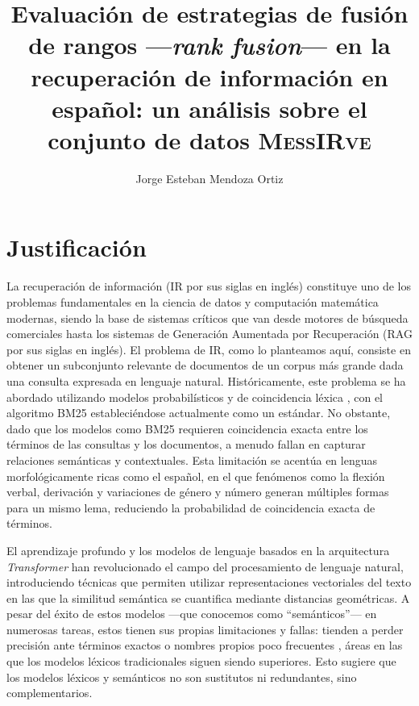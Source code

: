 \documentclass[12pt]{article}
\begin{document}
    
    
    \hyphenation{}
    
    \title{Evaluación de estrategias de fusión de rangos ---\textit{rank fusion}--- en la recuperación de información en español: un análisis sobre el conjunto de datos \textsc{MessIRve}}
    
    \author{Jorge Esteban Mendoza Ortiz}
    \date{}
    
    \maketitle
    
    \section{Justificación}\label{sec:justificacion}
    
    \noindent La recuperación de información (IR por sus siglas en inglés) constituye uno de los problemas fundamentales en la ciencia de datos y computación matemática modernas, siendo la base de sistemas críticos que van desde motores de búsqueda comerciales hasta los sistemas de Generación Aumentada por Recuperación (RAG por sus siglas en inglés). El problema de IR, como lo planteamos aquí, consiste en obtener un subconjunto relevante de documentos de un corpus más grande dada una consulta expresada en lenguaje natural. Históricamente, este problema se ha abordado utilizando modelos probabilísticos y de coincidencia léxica \parencite{manning2009introduction}, con el algoritmo BM25 \parencite{10.1561/1500000019} estableciéndose actualmente como un estándar. No obstante, dado que los modelos como BM25 requieren coincidencia exacta entre los términos de las consultas y los documentos, a menudo fallan en capturar relaciones semánticas y contextuales. Esta limitación se acentúa en lenguas morfológicamente ricas como el español, en el que fenómenos como la flexión verbal, derivación y variaciones de género y número generan múltiples formas para un mismo lema, reduciendo la probabilidad de coincidencia exacta de términos.
    
    El aprendizaje profundo y los modelos de lenguaje basados en la arquitectura \textit{Transformer} \parencite{NIPS2017_3f5ee243} han revolucionado el campo del procesamiento de lenguaje natural, introduciendo técnicas que permiten utilizar representaciones vectoriales del texto en las que la similitud semántica se cuantifica mediante distancias geométricas. A pesar del éxito de estos modelos ---que conocemos como ``semánticos''--- en numerosas tareas, estos tienen sus propias limitaciones y fallas: tienden a perder precisión ante términos exactos o nombres propios poco frecuentes \parencite{thakur2021beirheterogenousbenchmarkzeroshot}, áreas en las que los modelos léxicos tradicionales siguen siendo superiores. Esto sugiere que los modelos léxicos y semánticos no son sustitutos ni redundantes, sino complementarios.
    
\end{document}
